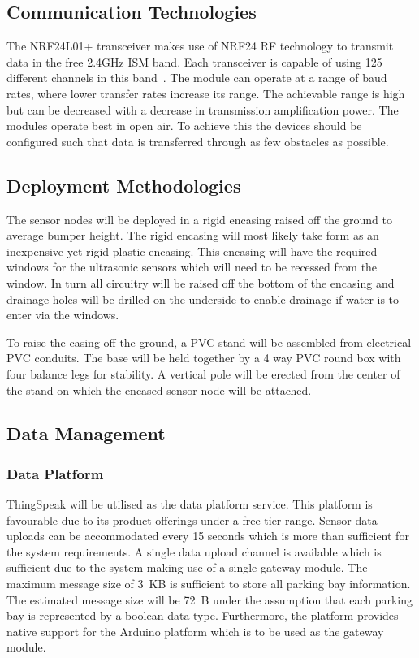 \documentclass[10pt,twocolumn]{witseiepaper}
\begin{document}
	\subsection{Communication Technologies}
		The NRF24L01+ transceiver makes use of NRF24 RF technology to transmit data in the free 2.4GHz ISM band. Each transceiver is capable of using 125 different channels in this band~\cite{howToMech_NRF24L01Tutorial}. The module can operate at a range of baud rates, where lower transfer rates increase its range. The achievable range is high but can be decreased with a decrease in transmission amplification power. The modules operate best in open air. To achieve this the devices should be configured such that data is transferred through as few obstacles as possible. 
		
	
	\subsection{Deployment Methodologies}
		The sensor nodes will be deployed in a rigid encasing raised off the ground to average bumper height. The rigid encasing will most likely take form as an inexpensive yet rigid plastic encasing. This encasing will have the required windows for the ultrasonic sensors which will need to be recessed from the window. In turn all circuitry will be raised off the bottom of the encasing and drainage holes will be drilled on the underside to enable drainage if water is to enter via the windows.
		
		To raise the casing off the ground, a PVC stand will be assembled from electrical PVC conduits. The base will be held together by a 4 way PVC round box with four balance legs for stability. A vertical pole will be erected from the center of the stand on which the encased sensor node will be attached.
	
	\subsection{Data Management}

	\subsubsection{Data Platform}
		ThingSpeak will be utilised as the data platform service. This platform is favourable due to its product offerings under a free tier range. Sensor data uploads can be accommodated every 15 seconds which is more than sufficient for the system requirements. A single data upload channel is available which is sufficient due to the system making use of a single gateway module. The maximum message size of 3~KB is sufficient to store all parking bay information. The estimated message size will be 72~B under the assumption that each parking bay is represented by a boolean data type. Furthermore, the platform provides native support for the Arduino platform which is to be used as the gateway module.
\end{document}
